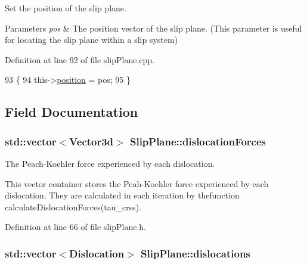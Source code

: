 Set the position of the slip plane. 


\begin{DoxyParams}{Parameters}
{\em pos} & The position vector of the slip plane. (This parameter is useful for locating the slip plane within a slip system) \\
\hline
\end{DoxyParams}


Definition at line 92 of file slip\-Plane.\-cpp.


\begin{DoxyCode}
93 \{
94   this->\hyperlink{classSlipPlane_ac2ac59e22e9638a990c9e45aaa096d9a}{position} = pos;
95 \}
\end{DoxyCode}


\subsection{Field Documentation}
\hypertarget{classSlipPlane_a2a74ae1f66a59e53a3ca0c9b81b28f7d}{
\subsubsection[{dislocation\-Forces}]{\setlength{\rightskip}{0pt plus 5cm}std\-::vector$<${\bf Vector3d}$>$ Slip\-Plane\-::dislocation\-Forces\hspace{0.3cm}{\ttfamily [protected]}}}\label{db/d25/classSlipPlane_a2a74ae1f66a59e53a3ca0c9b81b28f7d}


The Peach-\/\-Koehler force experienced by each dislocation. 

This vector container stores the Peah-\/\-Koehler force experienced by each dislocation. They are calculated in each iteration by thefunction calculate\-Dislocation\-Forces(tau\-\_\-crss). 

Definition at line 66 of file slip\-Plane.\-h.

\hypertarget{classSlipPlane_ad92c7c409f7e161db449528389180910}{
\subsubsection[{dislocations}]{\setlength{\rightskip}{0pt plus 5cm}std\-::vector$<${\bf Dislocation}$>$ Slip\-Plane\-::dislocations\hspace{0.3cm}{\ttfamily [protected]}}}\label{db/d25/classSlipPlane_ad92c7c409f7e161db449528389180910}


